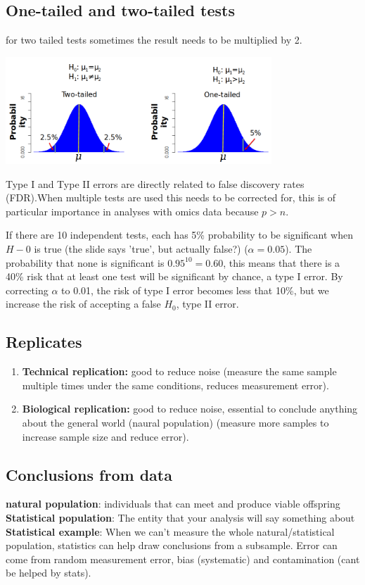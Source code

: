 \documentclass{article}
\begin{document}
\subsection{One-tailed and two-tailed tests}
for two tailed tests sometimes the result needs to be multiplied by 2.
\begin{center}
    \includegraphics[width = 0.75\textwidth]{intro/tailed-tests.png}
\end{center}
Type I and Type II errors are directly related to false discovery rates (FDR).When multiple tests are used this needs to be corrected for, this is of particular importance in analyses with omics data because $p > n$.\par 
If there are 10 independent tests, each has 5\% probability to be significant when $H-0$ is true (the slide says 'true', but actually false?) ($\alpha = 0.05$). The probability that none is significant is $0.95^{10} = 0.60$, this means that there is a 40\% risk that at least one test will be significant by chance, a type I error. By correcting $\alpha$ to 0.01, the risk of type I error becomes less that 10\%, but we increase the risk of accepting a false $H_0$, type II error.

\subsection{Replicates}
\begin{enumerate}
    \item \textbf{Technical replication:} good to reduce noise (measure the same sample multiple times under the same conditions, reduces measurement error).
    \item \textbf{Biological replication:} good to reduce noise, essential to conclude anything about the general world (naural population) (measure more samples to increase sample size and reduce error).
\end{enumerate}


\subsection{Conclusions from data}
\textbf{natural population}: individuals that can meet and produce viable offspring\\
\textbf{Statistical population}: The entity that your analysis will say something about \\
\textbf{Statistical example}: When we can't measure the whole natural/statistical population, statistics can help draw conclusions from a subsample. 
Error can come from random measurement error, bias (systematic) and contamination (cant be helped by stats).
\end{document}
